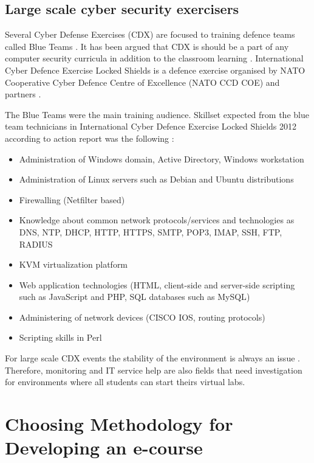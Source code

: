 \subsection{Large scale cyber security exercisers}
Several Cyber Defense Exercises (\gls{CDX}) are focused to training defence teams called Blue Teams \citep{website:NATO_CCD_COE,schepens_CDX}. It has been argued that \gls{CDX} is should be a part of  any computer security curricula in addition to the classroom learning \citep{adams_CDX_curricula}. International Cyber Defence Exercise Locked Shields is a defence exercise organised by NATO Cooperative Cyber Defence Centre of Excellence (\gls{NATO CCD COE}) and partners  \citep{website:NATO_CCD_COE}. 

The Blue Teams were the main training audience.
Skillset expected from the blue team technicians in International Cyber Defence Exercise Locked Shields 2012 according to action report was the following \citep{website:NATO_CCD_COE}:
\begin{itemize}
\item Administration of Windows domain, Active Directory, Windows workstation
\item Administration of Linux servers such as Debian and Ubuntu distributions
\item Firewalling (Netfilter based)
\item Knowledge about common network protocols/services and technologies as \gls{DNS}, \gls{NTP}, \gls{DHCP}, \gls{HTTP}, \gls{HTTPS}, \gls{SMTP}, \gls{POP3}, \gls{IMAP}, \gls{SSH}, \gls{FTP}, \gls{RADIUS}
\item \gls{KVM} virtualization platform
\item Web application technologies (\gls{HTML}, client-side and server-side scripting
such as JavaScript and \gls{PHP}, \gls{SQL} databases such as \gls{MySQL})
\item Administering of network devices (CISCO IOS, routing protocols)
\item Scripting skills in Perl
\end{itemize}

For large scale \gls{CDX} events the stability of the environment is always an issue \citep{website:NATO_CCD_COE,schepens_CDX}. {\color{red} Therefore, monitoring and IT service help are also fields that need investigation for environments where all students can start theirs virtual labs. }

\section{Choosing Methodology for Developing an e-course}

